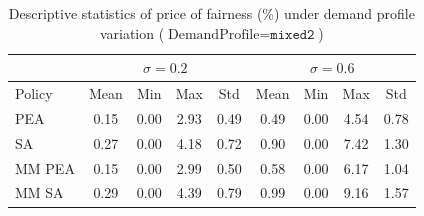 \begin{table}[h]
\centering
\caption{Descriptive statistics of price of fairness (\%) under demand profile variation ($\text{DemandProfile}=\texttt{mixed2}$)}
\label{tab:price_of_fairness_demand}
\begin{tabular}{lcccccccc}
\hline
 & \multicolumn{4}{c}{$\sigma = 0.2$} & \multicolumn{4}{c}{$\sigma = 0.6$} \\
\hline
Policy & Mean & Min & Max & Std & Mean & Min & Max & Std \\
\hline
 PEA & 0.15 & 0.00 & 2.93 & 0.49 & 0.49 & 0.00 & 4.54 & 0.78 \\
 SA & 0.27 & 0.00 & 4.18 & 0.72 & 0.90 & 0.00 & 7.42 & 1.30 \\
 MM PEA & 0.15 & 0.00 & 2.99 & 0.50 & 0.58 & 0.00 & 6.17 & 1.04 \\
 MM SA & 0.29 & 0.00 & 4.39 & 0.79 & 0.99 & 0.00 & 9.16 & 1.57 \\
\hline
\end{tabular}
\end{table}
